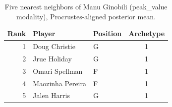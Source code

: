 \begin{table}[htbp]
  \centering\small
  \begin{tabular}{rllc}
    \toprule
    Rank & Player & Position & Archetype \\
    \midrule
    1 & Doug Christie & G & 1 \\
    2 & Jrue Holiday & G & 1 \\
    3 & Omari Spellman & F & 1 \\
    4 & Maozinha Pereira & F & 1 \\
    5 & Jalen Harris & G & 1 \\
    \bottomrule
  \end{tabular}
  \caption{Five nearest neighbors of Manu Ginobili (peak_value modality), Procrustes-aligned posterior mean.}
  \label{tab:Manu_Ginobili_neighbors_peak_value}
\end{table}

